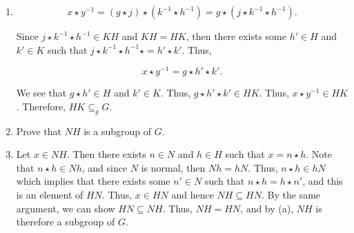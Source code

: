 \documentclass[12pt]{article}
\makeatletter
\theoremstyle{definition}
\theoremstyle{remark}
\renewenvironment{proof}[1][\proofname]{\par
  \pushQED{\qed}%
  \normalfont \topsep6\p@\@plus6\p@\relax
  \list{}{\leftmargin=0mm
          \rightmargin=0mm
          \settowidth{\itemindent}{\itshape#1}%
          \labelwidth=\itemindent
          \parsep=0pt \listparindent=\parindent 
  }
  \item[\hskip\labelsep
        \itshape
    #1\@addpunct{.}]\ignorespaces
}{%
  \popQED\endlist\@endpefalse
}
\let\oldproofname=\proofname
\renewcommand{\proofname}{\bf{\textit{\oldproofname}}}
\makeatother
\begin{document}
\begin{enumerate}[leftmargin=*]
\begin{enumerate}[label=\alph*)]
\begin{proof}
                        \begin{equation*}
                            x\star y^{-1} =(g\star j)\star (k^{-1}\star h^{-1})=g\star (j\star k^{-1}\star h^{-1}).
                        \end{equation*}
                        
                        Since $j\star k^{-1}\star h^{-1}\in KH$ and $KH=HK$, then there exists some $h'\in H$ and $k'\in K$ such that $j\star k^{-1}\star h^{-1}\star=h'\star k'$. Thus, 
                        
                        \begin{equation*}
                            x\star y^{-1}=g\star h'\star k'.
                        \end{equation*}
                        
                        We see that $g\star h'\in H$ and $k'\in K$. Thus, $g\star h'\star k'\in HK$. Thus, $x\star y^{-1}\in HK$. Therefore, $HK\subseteq_g G$.
                    \end{proof}
                    
                \item Prove that $NH$ is a subgroup of $G$.
                    \begin{proof}
                        Let $x\in NH$. Then there exists $n\in N$ and $h\in H$ such that $x=n\star h$. Note that $n\star h\in Nh$, and since $N$ is normal, then $Nh=hN$. Thus, $n\star h\in hN$ which implies that there exists some $n'\in N$ such that $n\star h=h\star n'$, and this is an element of $HN$. Thus, $x\in HN$ and hence $NH\subseteq HN$. By the same argument, we can show $HN\subseteq NH$. Thus, $NH=HN$, and by (a), $NH$ is therefore a subgroup of $G$.
                    \end{proof}
            \end{enumerate}
    \end{enumerate}
\end{document}
